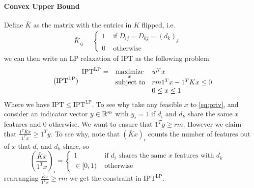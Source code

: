 \documentclass[12pt]{article}
\newcommand{\priv}{\text{IPT}}
\newcommand{\privl}{\text{IPT}^\text{LP}}
\begin{document}
\paragraph{Convex Upper Bound}
Define $\bar{K}$ as the matrix with the entries in $K$ flipped, i.e.
\begin{align*}
    \bar{K}_{ij} = \begin{cases}
        1 & \text{ if } D_{ij} = D_{kj} = (d_k)_j\\
        0 & \text{ otherwise}
    \end{cases}
\end{align*} 
we can then write an \gls{LP} relaxation of \gls{IPT} as the following problem
\begin{equation}
	\label{eq:privs_k} 
    \tag{$\privl$} 
	\begin{array}{lll}
		\privl = & \underset{x}{\text{maximize}} & w^T x \\
		& \mbox{subject to} & rm 1^Tx - 1^TKx \leq 0 \\
        && 0\leq x \leq 1
		\end{array}
\end{equation}
Where we have $\priv \leq \privl$. To see why take any feasible $x$ to \eqref{eq:priv}, and consider an indicator vector $y \in \mathbb{R}^m$ with 
$y_i = 1$ if $d_i$ and $d_k$ share the same $x$ features and $0$ otherwise. We want to ensure that $1^T y \geq rm$. However we claim that $\frac{1^T \bar{K}x}{1^Tx} \geq 1^T y$. To see why, note that $(\bar{K}x)_i$ counts the number of features out of $x$ that $d_i$ and $d_k$ share, so 
\[\left(\frac{\bar{K}x}{1^T x}\right)_i = 
\begin{cases}
    1 & \text{ if } d_i \text{ shares the same } x \text{ features with } d_k \\
    \in [0,1) & \text{ otherwise}
\end{cases}\]
rearranging $\frac{\bar{K}x}{1^T x} \geq rm$ we get the constraint in $\privl$. 
\end{document}
